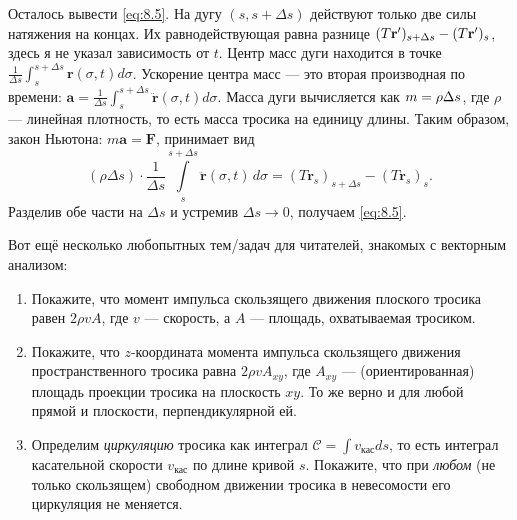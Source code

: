 {\sloppy

Осталось вывести \eqref{eq:8.5}.
На дугу $(s, s+\Delta s)$ действуют только две силы натяжения на концах.
Их равнодействующая равна разнице
$(T \mathbf{r}')_{s+\Delta s}\z-(T \mathbf{r}')_s$,
здесь я не указал зависимость от $t$.
Центр масс дуги находится в точке $
\tfrac{1}{\Delta s} \int_s^{s+\Delta s} \mathbf{r}(\sigma, t) d\sigma$.
Ускорение центра масс --- это вторая производная по времени:
$\mathbf{a}=\tfrac{1}{\Delta s} \int_s^{s+\Delta s} \ddot{\mathbf{r}}(\sigma, t) d\sigma$.
Масса дуги вычисляется как $m \z= \rho \Delta s$, где $\rho$ --- линейная плотность, то есть масса тросика на единицу длины.
Таким образом, закон Ньютона: $m\mathbf{a}=\mathbf{F}$, принимает вид
\begin{equation}
(\rho \Delta s)
\cdot
\frac{1}{\Delta s}
\int\limits_s^{s+\Delta s}
\ddot{\mathbf{r}}(\sigma, t)\, d\sigma
= (T \mathbf{r}_s)_{s+\Delta s}-(T \mathbf{r}_s)_s .
\end{equation}
Разделив обе части на $\Delta s$ и устремив $\Delta s \to 0$, получаем \eqref{eq:8.5}.

}

\medskip

Вот ещё несколько любопытных тем/задач для читателей, знакомых с векторным анализом:

\begin{enumerate}
\item Покажите, что момент импульса скользящего движения плоского тросика равен
$2\rho v A$,
где $v$ --- скорость, а $A$ --- площадь, охватываемая тросиком.
\item Покажите, что $z$-координата момента импульса скользящего движения пространственного тросика равна
$
2\rho v A_{xy}
$,
где $A_{xy}$ --- (ориентированная) площадь проекции тросика на плоскость $xy$.
То же верно и для любой прямой и плоскости, перпендикулярной ей.
\item Определим \emph{циркуляцию} тросика как интеграл
$\mathcal{C}=\int v_{\text{кас}} ds$,
то есть интеграл касательной скорости $v_{\text{кас}}$ по длине кривой $s$.
Покажите, что при \emph{любом} (не только скользящем) свободном движении тросика в невесомости
его циркуляция не меняется.
\end{enumerate}

